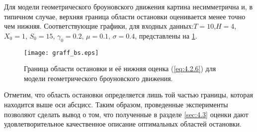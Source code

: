 Для модели геометрического броуновского движения картина несимметрична и, в типичном случае, верхняя граница области остановки оценивается менее точно чем нижняя. Соответствующие графики, для входных данных:$T=10$,$H=4$, $X_0=1$, $S_0=15$, $\gamma_0=0.2$, $\mu=0.1$, $\sigma=0.4$, представлены на \ref{fig:4.2}.

\begin{figure}[h!]
        \centering
          \texttt{[image: graff\_bs.eps]}
          \caption{Граница области остановки и её нижняя оценка (\ref{eq:4.2.6}) для модели геометрического броуновского движения.}
          \label{fig:4.2}
\end{figure}

Отметим, что область остановки определяется лишь той частью границы, которая находится выше оси абсцисс.
Таким образом, проведенные эксперименты позволяют сделать вывод о том, что полученные в разделе \ref{sec:4.3} оценки дают удовлетворительное качественное описание оптимальных областей остановки.

\clearpage 